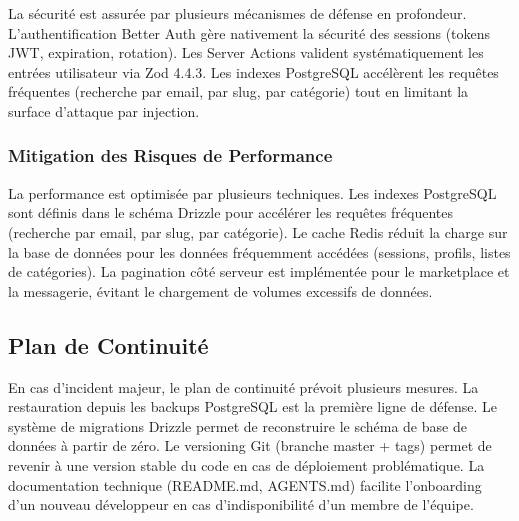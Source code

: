 La sécurité est assurée par plusieurs mécanismes de défense en profondeur. L'authentification Better Auth gère nativement la sécurité des sessions (tokens JWT, expiration, rotation). Les Server Actions valident systématiquement les entrées utilisateur via Zod 4.4.3. Les indexes PostgreSQL accélèrent les requêtes fréquentes (recherche par email, par slug, par catégorie) tout en limitant la surface d'attaque par injection.



\subsubsection{Mitigation des Risques de Performance}



La performance est optimisée par plusieurs techniques. Les indexes PostgreSQL sont définis dans le schéma Drizzle pour accélérer les requêtes fréquentes (recherche par email, par slug, par catégorie). Le cache Redis réduit la charge sur la base de données pour les données fréquemment accédées (sessions, profils, listes de catégories). La pagination côté serveur est implémentée pour le marketplace et la messagerie, évitant le chargement de volumes excessifs de données.



\subsection{Plan de Continuité}



En cas d'incident majeur, le plan de continuité prévoit plusieurs mesures. La restauration depuis les backups PostgreSQL est la première ligne de défense. Le système de migrations Drizzle permet de reconstruire le schéma de base de données à partir de zéro. Le versioning Git (branche master + tags) permet de revenir à une version stable du code en cas de déploiement problématique. La documentation technique (README.md, AGENTS.md) facilite l'onboarding d'un nouveau développeur en cas d'indisponibilité d'un membre de l'équipe.

